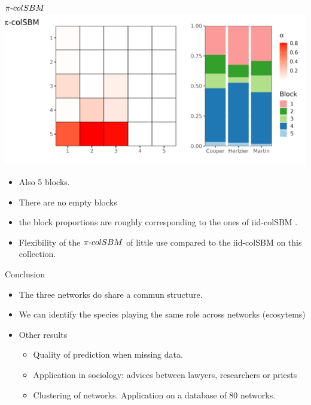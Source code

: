 \documentclass[compress,10pt]{beamer}
\begin{document}
\begin{frame}{$\pi\text{-}colSBM$}
\centering
\includegraphics[width =0.5 \textwidth]{plots/plot_picolsbm}

\begin{itemize}
\item Also 5 blocks.
\item There are no empty blocks 
\item the block
proportions are roughly corresponding to the ones of iid-colSBM . 
\item Flexibility of the $\pi\text{-}colSBM$ of little use compared to the iid-colSBM
on this collection.
\end{itemize}

\end{frame}

\begin{frame}{Conclusion}
\begin{itemize}
 \item The three networks do share a commun structure. 
\item We can identify the species playing the same role across networks (ecosytems)
\item Other results
\begin{itemize}
\item Quality of prediction when missing data. 
\item Application in sociology: advices between lawyers, researchers  or priests
\item Clustering of networks. Application on a database of 80 networks. 
\end{itemize}


 
\end{itemize}


\end{frame}
\end{document}
